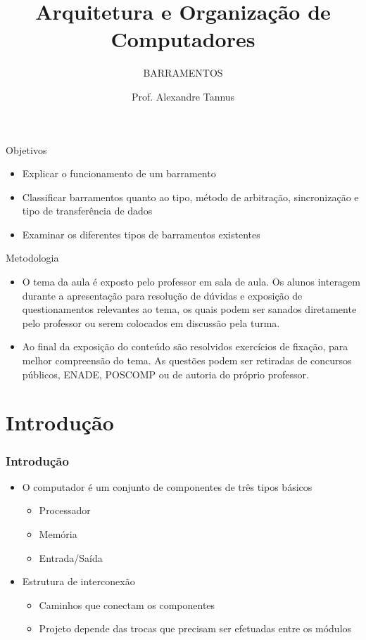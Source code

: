 \documentclass[aspectratio=169,
				xcolor=table]{beamer}
\institute[]{\uppercase{Engenharia de Software}}
\title[]{Arquitetura e Organização de Computadores}
\subtitle[]{\uppercase{Barramentos}}
\author[]{Prof. Alexandre Tannus}
\date{}
\begin{document}
	\begin{frame}
		\titlepage
	\end{frame}

	\begin{frame}{Objetivos}
		\begin{itemize}
			\item Explicar o funcionamento de um barramento
			\vspace{1em}
			\item Classificar barramentos quanto ao tipo, método de arbitração, sincronização e tipo de transferência de dados
			\vspace{1em} 
			\item Examinar os diferentes tipos de barramentos existentes
		\end{itemize}
	\end{frame}

	\begin{frame}{Metodologia}
		\begin{itemize}
			\item O tema da aula é exposto pelo professor em sala de aula. Os alunos interagem durante a apresentação para resolução de dúvidas e exposição de questionamentos relevantes ao tema, os quais podem ser sanados diretamente pelo professor ou serem colocados em discussão pela turma. 
			\vspace{1em}
			\item Ao final da exposição do conteúdo são resolvidos exercícios de fixação, para melhor compreensão do tema. As questões podem ser retiradas de concursos públicos, ENADE, POSCOMP ou de autoria do próprio professor.
		\end{itemize}
	\end{frame}

	\begin{frame}
		\tableofcontents		
	\end{frame}	
	
	\section{Introdução}
	\begin{frame}
		\frametitle{Introdução}
		\begin{itemize}
			\item O computador é um conjunto de componentes de três tipos básicos
			\begin{itemize}
				\item Processador
				\item Memória
				\item Entrada/Saída
			\end{itemize}
			\vspace{1em}
			\item Estrutura de interconexão
			\begin{itemize}
				\item Caminhos que conectam os componentes
				\item Projeto depende das trocas que precisam ser efetuadas entre os módulos
			\end{itemize}
		\end{itemize}
	\end{frame}
	
\end{document}
